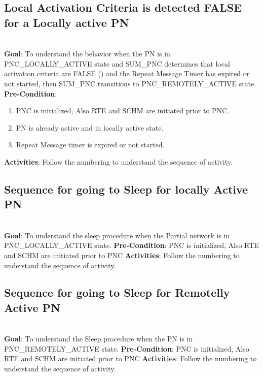 \subsection{Local Activation Criteria is detected FALSE for a Locally active PN}
\\
\textbf{Goal}: To understand the behavior when the PN is in PNC\_LOCALLY\_ACTIVE state and SUM\_PNC determines that local activation criteria are FALSE () and the Repeat Message Timer has expired or not started, then SUM\_PNC transitions to PNC\_REMOTELY\_ACTIVE state.\newline
\textbf{Pre-Condition}:
\begin{enumerate}
\item PNC is initialized, Also RTE and SCHM are initiated prior to PNC.
\item PN is already active and in locally active state.
\item Repeat Message timer is expired or not started.
\end{enumerate}
\textbf{Activities}: Follow the numbering to understand the sequence of activity.



\subsection{Sequence for going to Sleep for locally Active PN}
\\
\textbf{Goal}: To understand the sleep procedure when the Partial network is in PNC_LOCALLY_ACTIVE state.\newline
\textbf{Pre-Condition}: PNC is initialized, Also RTE and SCHM are initiated prior to PNC\newline
\textbf{Activities}: Follow the numbering to understand the sequence of activity.



\subsection{Sequence for going to Sleep for Remotelly Active PN}
\\
\textbf{Goal}: To understand the Sleep procedure when the PN is in PNC_REMOTELY_ACTIVE state.\newline
\textbf{Pre-Condition}: PNC is initialized, Also RTE and SCHM are initiated prior to PNC \newline
\textbf{Activities}: Follow the numbering to understand the sequence of activity.


